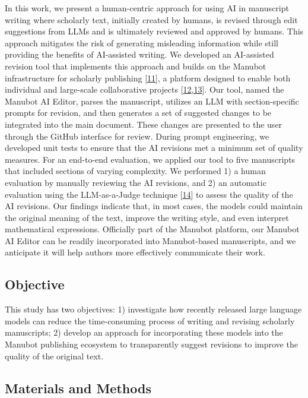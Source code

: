 \documentclass[
]{article}
\begin{document}
In this work, we present a human-centric approach for using AI in manuscript writing where scholarly text, initially created by humans, is revised through edit suggestions from LLMs and is ultimately reviewed and approved by humans.
This approach mitigates the risk of generating misleading information while still providing the benefits of AI-assisted writing.
We developed an AI-assisted revision tool that implements this approach and builds on the Manubot infrastructure for scholarly publishing {[}\protect\hyperlink{ref-YuJbg3zO}{11}{]}, a platform designed to enable both individual and large-scale collaborative projects {[}\protect\hyperlink{ref-PZMP42Ak}{12},\protect\hyperlink{ref-10gsAq0o}{13}{]}.
Our tool, named the Manubot AI Editor, parses the manuscript, utilizes an LLM with section-specific prompts for revision, and then generates a set of suggested changes to be integrated into the main document.
These changes are presented to the user through the GitHub interface for review.
During prompt engineering, we developed unit tests to ensure that the AI revisions met a minimum set of quality measures.
For an end-to-end evaluation, we applied our tool to five manuscripts that included sections of varying complexity.
We performed 1) a human evaluation by manually reviewing the AI revisions, and 2) an automatic evaluation using the LLM-as-a-Judge technique {[}\protect\hyperlink{ref-LhEwBH2w}{14}{]} to assess the quality of the AI revisions.
Our findings indicate that, in most cases, the models could maintain the original meaning of the text, improve the writing style, and even interpret mathematical expressions.
Officially part of the Manubot platform, our Manubot AI Editor can be readily incorporated into Manubot-based manuscripts, and we anticipate it will help authors more effectively communicate their work.

\subsection{Objective}

This study has two objectives:
1) investigate how recently released large language models can reduce the time-consuming process of writing and revising scholarly manuscripts;
2) develop an approach for incorporating these models into the Manubot publishing ecosystem to transparently suggest revisions to improve the quality of the original text.

\subsection{Materials and Methods}
\end{document}
